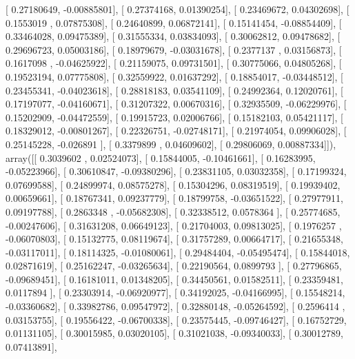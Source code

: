 \documentclass{article}
\begin{document}
       [ 0.27180649, -0.00885801],
       [ 0.27374168,  0.01390254],
       [ 0.23469672,  0.04302698],
       [ 0.1553019 ,  0.07875308],
       [ 0.24640899,  0.06872141],
       [ 0.15141454, -0.08854409],
       [ 0.33464028,  0.09475389],
       [ 0.31555334,  0.03834093],
       [ 0.30062812,  0.09478682],
       [ 0.29696723,  0.05003186],
       [ 0.18979679, -0.03031678],
       [ 0.2377137 ,  0.03156873],
       [ 0.1617098 , -0.04625922],
       [ 0.21159075,  0.09731501],
       [ 0.30775066,  0.04805268],
       [ 0.19523194,  0.07775808],
       [ 0.32559922,  0.01637292],
       [ 0.18854017, -0.03448512],
       [ 0.23455341, -0.04023618],
       [ 0.28818183,  0.03541109],
       [ 0.24992364,  0.12020761],
       [ 0.17197077, -0.04160671],
       [ 0.31207322,  0.00670316],
       [ 0.32935509, -0.06229976],
       [ 0.15202909, -0.04472559],
       [ 0.19915723,  0.02006766],
       [ 0.15182103,  0.05421117],
       [ 0.18329012, -0.00801267],
       [ 0.22326751, -0.02748171],
       [ 0.21974054,  0.09906028],
       [ 0.25145228, -0.026891  ],
       [ 0.3379899 ,  0.04609602],
       [ 0.29806069,  0.00887334]]), array([[ 0.3039602 ,  0.02524073],
       [ 0.15844005, -0.10461661],
       [ 0.16283995, -0.05223966],
       [ 0.30610847, -0.09380296],
       [ 0.23831105,  0.03032358],
       [ 0.17199324,  0.07699588],
       [ 0.24899974,  0.08575278],
       [ 0.15304296,  0.08319519],
       [ 0.19939402,  0.00659661],
       [ 0.18767341,  0.09237779],
       [ 0.18799758, -0.03651522],
       [ 0.27977911,  0.09197788],
       [ 0.2863348 , -0.05682308],
       [ 0.32338512,  0.0578364 ],
       [ 0.25774685, -0.00247606],
       [ 0.31631208,  0.06649123],
       [ 0.21704003,  0.09813025],
       [ 0.1976257 , -0.06070803],
       [ 0.15132775,  0.08119674],
       [ 0.31757289,  0.00664717],
       [ 0.21655348, -0.03117011],
       [ 0.18114325, -0.01080061],
       [ 0.29484404, -0.05495474],
       [ 0.15844018,  0.02871619],
       [ 0.25162247, -0.03265634],
       [ 0.22190564,  0.0899793 ],
       [ 0.27796865, -0.09689451],
       [ 0.16181011,  0.01348205],
       [ 0.34450561,  0.01582511],
       [ 0.23359481,  0.0117894 ],
       [ 0.23303914, -0.06920977],
       [ 0.34192025, -0.04166995],
       [ 0.15548214, -0.03360682],
       [ 0.33982786,  0.09547972],
       [ 0.32880148, -0.05264592],
       [ 0.2596414 ,  0.03153755],
       [ 0.19556422, -0.06700338],
       [ 0.23575445, -0.09746427],
       [ 0.16752729,  0.01131105],
       [ 0.30015985,  0.03020105],
       [ 0.31021038, -0.09340033],
       [ 0.30012789,  0.07413891],
\end{document}
